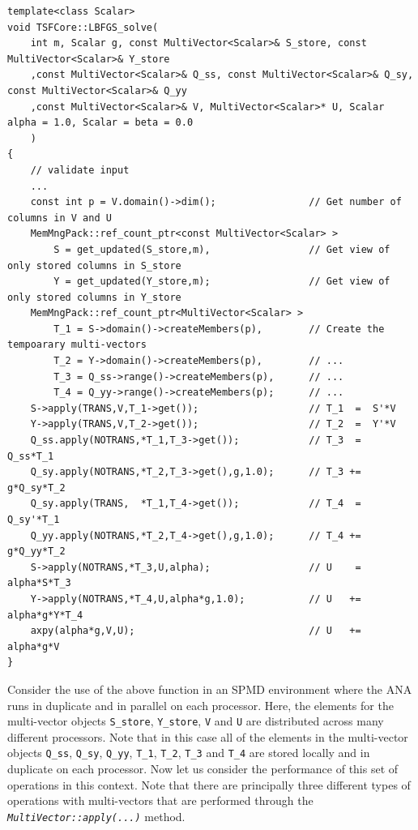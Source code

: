 {\scriptsize\begin{verbatim}
template<class Scalar>
void TSFCore::LBFGS_solve(
    int m, Scalar g, const MultiVector<Scalar>& S_store, const MultiVector<Scalar>& Y_store
    ,const MultiVector<Scalar>& Q_ss, const MultiVector<Scalar>& Q_sy, const MultiVector<Scalar>& Q_yy
    ,const MultiVector<Scalar>& V, MultiVector<Scalar>* U, Scalar alpha = 1.0, Scalar = beta = 0.0
    )
{
    // validate input
    ...
    const int p = V.domain()->dim();                // Get number of columns in V and U
    MemMngPack::ref_count_ptr<const MultiVector<Scalar> >
        S = get_updated(S_store,m),                 // Get view of only stored columns in S_store
        Y = get_updated(Y_store,m);                 // Get view of only stored columns in Y_store
    MemMngPack::ref_count_ptr<MultiVector<Scalar> >
        T_1 = S->domain()->createMembers(p),        // Create the tempoarary multi-vectors
        T_2 = Y->domain()->createMembers(p),        // ...
        T_3 = Q_ss->range()->createMembers(p),      // ...
        T_4 = Q_yy->range()->createMembers(p);      // ...
    S->apply(TRANS,V,T_1->get());                   // T_1  =  S'*V
    Y->apply(TRANS,V,T_2->get());                   // T_2  =  Y'*V
    Q_ss.apply(NOTRANS,*T_1,T_3->get());            // T_3  =  Q_ss*T_1
    Q_sy.apply(NOTRANS,*T_2,T_3->get(),g,1.0);      // T_3 +=  g*Q_sy*T_2
    Q_sy.apply(TRANS,  *T_1,T_4->get());            // T_4  =  Q_sy'*T_1
    Q_yy.apply(NOTRANS,*T_2,T_4->get(),g,1.0);      // T_4 +=  g*Q_yy*T_2
    S->apply(NOTRANS,*T_3,U,alpha);                 // U    =  alpha*S*T_3
    Y->apply(NOTRANS,*T_4,U,alpha*g,1.0);           // U   +=  alpha*g*Y*T_4
    axpy(alpha*g,V,U);                              // U   +=  alpha*g*V
}
\end{verbatim}}

Consider the use of the above function in an SPMD environment where
the ANA runs in duplicate and in parallel on each processor.  Here,
the elements for the multi-vector objects \texttt{S\_store},
\texttt{Y\_store}, \texttt{V} and \texttt{U} are distributed across
many different processors.  Note that in this case all of the elements
in the multi-vector objects \texttt{Q\_ss}, \texttt{Q\_sy}, \texttt{Q\_yy},
\texttt{T\_1}, \texttt{T\_2}, \texttt{T\_3} and \texttt{T\_4} are stored
locally and in duplicate on each processor.  Now let us consider the
performance of this set of operations in this context.  Note that
there are principally three different types of operations with
multi-vectors that are performed through the
\texttt{\textit{Multi\-Vector\-::apply(\-...)}} method.

